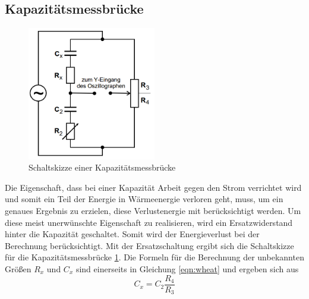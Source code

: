\subsection{Kapazitätsmessbrücke} \label{subsec:capmesbridge}
\begin{figure}
    \centering  
    \caption{Schaltskizze einer Kapazitätsmessbrücke}
    \label{fig:capmesbridge}
    \includegraphics[width = 0.5\textwidth]{bridges/capmesbridge.png}
\end{figure}
Die Eigenschaft, dass bei einer Kapazität Arbeit gegen den Strom verrichtet wird und somit ein Teil der Energie in Wärmeenergie verloren geht, muss, um ein genaues
Ergebnis zu erzielen, diese Verlustenergie mit berücksichtigt werden. Um diese meist unerwünschte Eigenschaft zu realisieren, wird ein Ersatzwiderstand 
hinter die Kapazität geschaltet. Somit wird der Energieverlust bei der Berechnung berücksichtigt. Mit der Ersatzschaltung ergibt sich die Schaltskizze 
für die Kapazitätsmessbrücke \ref{fig:capmesbridge}. Die Formeln für die Berechnung der unbekannten Größen $R_x$ und $C_x$ sind einerseits in Gleichung
\eqref{eqn:wheat} und ergeben sich aus 
\begin{equation}
    C_x = C_2 \frac{R_4}{R_3}
\end{equation}
